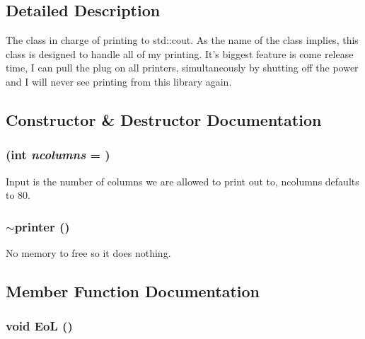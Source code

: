 \subsection{Detailed Description}
The class in charge of printing to std::cout. As the name of the class implies, this class is designed to handle all of my printing. It's biggest feature is come release time, I can pull the plug on all printers, simultaneously by shutting off the power and I will never see printing from this library again. 

\subsection{Constructor \& Destructor Documentation}
\hypertarget{classJKBuilder_1_1printer_af4e2cc2ab8b108895389d46fa14d4a13}{
\subsubsection[{printer}]{ (int {\em ncolumns} = {})}}
\label{classJKBuilder_1_1printer_af4e2cc2ab8b108895389d46fa14d4a13}


Input is the number of columns we are allowed to print out to, ncolumns defaults to 80. \hypertarget{classJKBuilder_1_1printer_a555702a98f98cda2ba39f19c0c9397c6}{
\subsubsection[{$\sim$printer}]{\setlength{\rightskip}{0pt plus 5cm}$\sim${\bf printer} ()}}
\label{classJKBuilder_1_1printer_a555702a98f98cda2ba39f19c0c9397c6}


No memory to free so it does nothing. 

\subsection{Member Function Documentation}
\hypertarget{classJKBuilder_1_1printer_a7f207ac705d33a0cd9794a9f0b4a1fa0}{
\subsubsection[{EoL}]{\setlength{\rightskip}{0pt plus 5cm}void EoL ()}}
\label{classJKBuilder_1_1printer_a7f207ac705d33a0cd9794a9f0b4a1fa0}


